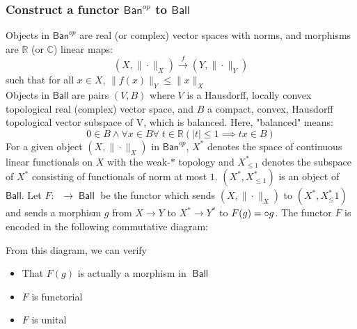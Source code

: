 \documentclass{article}
\newcommand{\R}{\mathbb{R}}
\newcommand{\C}{\mathbb{C}}
\DeclareMathOperator{\banop}{\textsf{Ban}^{op}}
\DeclareMathOperator{\ball}{\textsf{Ball}}
\begin{document}
\subsubsection{Construct a functor $\textsf{Ban}^{op}$ to $\textsf{Ball}$}
Objects in $\textsf{Ban}^{op}$ are real (or complex) vector spaces with norms, and morphisms are $\R$ (or $\C$) linear maps:
\begin{equation*}
(X,\|\cdot\|_X)\xrightarrow{f}(Y,\|\cdot\|_Y)
\end{equation*}
such that for all $x\in X$, $\|f(x)\|_Y\leq\|x\|_X$\\
Objects in $\textsf{Ball}$ are pairs $(V,B)$ where $V$ is a Hausdorff, locally convex topological real (complex) vector space, and $B$ a compact, convex, Hausdorff topological vector subspace of V, which is balanced.  Here, "balanced" means:
\begin{equation*}
0\in B\wedge\forall x\in B \forall\;t\in\R (|t|\leq 1\implies tx\in B)
\end{equation*}
For a given object $(X,\|\cdot\|_X)$ in $\textsf{Ban}^{op}$, $X^*$ denotes the space of continuous linear functionals on $X$ with the weak-$*$ topology and $X^*_{\leq1}$ denotes the subspace of $X^*$ consisting of functionals of norm at most $1$. $(X^*,X^*_{\leq1})$ is an object of $\textsf{Ball}$.
Let $F: \banop\rightarrow\ball$ be the functor which sends $(X,\|\cdot\|_X)$ to $(X^*,X^*_\leq{1})$ and sends a morphism $g$ from $X\rightarrow{Y}$ to $ X^*\rightarrow{Y^*}$ to $F(g) = \-\circ{g}$.  The functor $F$ is encoded in the following commutative diagram:
\begin{center}
\end{center}
From this diagram, we can verify
\begin{itemize}
	\item That $F(g)$ is actually a morphism in $\ball$
	\item $F$ is functorial
	\item $F$ is unital
\end{itemize}
\end{document}

